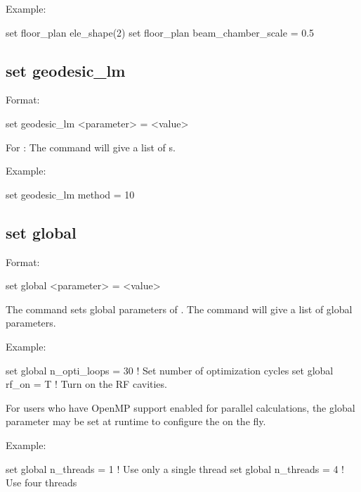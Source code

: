 {{{Example:
\begin{example}
  set floor_plan ele_shape(2)%
  set floor_plan beam_chamber_scale = 0.5
\end{example}


\subsection{set geodesic_lm}
\label{s:set.geodesic.lm}

Format:
\begin{example}
  set geodesic_lm <parameter> = <value>
\end{example}

For : The  command will give a list of
s.

Example:
\begin{example}
  set geodesic_lm method = 10
\end{example}


\subsection{set global}
\label{s:set.global}

Format:
\begin{example}
  set global <parameter> = <value>
\end{example}

The  command sets global parameters of \tao. The  command will give
a list of global parameters.

Example:
\begin{example}
  set global n_opti_loops = 30  ! Set number of optimization cycles
  set global rf_on = T          ! Turn on the RF cavities.
\end{example}

For users who have OpenMP support enabled for parallel calculations, the global
parameter  may be set at runtime to configure the
 on the fly.

Example:
\begin{example}
  set global n_threads = 1  ! Use only a single thread
  set global n_threads = 4  ! Use four threads
\end{example}

}}}
